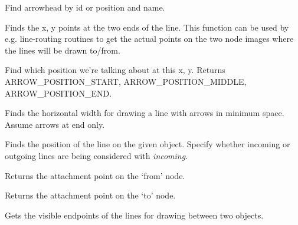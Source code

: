 Find arrowhead by id or position and name.



Finds the x, y points at the two ends of the line. This function can be
used by e.g. line-routing routines to get the actual points on the two
node images where the lines will be drawn to/from.



Find which position we're talking about at this x, y.
Returns ARROW\_POSITION\_START, ARROW\_POSITION\_MIDDLE, ARROW\_POSITION\_END.



Finds the horizontal width for drawing a line with arrows in minimum
space. Assume arrows at end only.



Finds the position of the line on the given object. Specify whether incoming or outgoing lines are
being considered with {\it incoming}.



Returns the attachment point on the `from' node.



Returns the attachment point on the `to' node.



Gets the visible endpoints of the lines for drawing between two objects.


